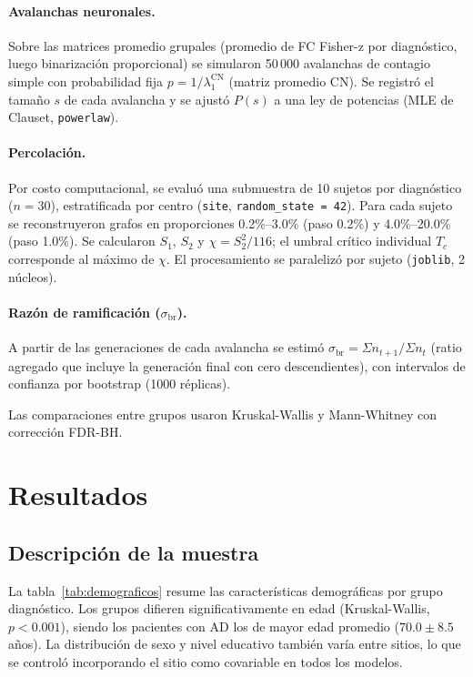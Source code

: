 \documentclass[12pt,a4paper]{article}
\begin{document}
\paragraph{Avalanchas neuronales.} Sobre las matrices promedio grupales (promedio de FC Fisher-z
por diagnóstico, luego binarización proporcional) se simularon 50\,000 avalanchas de contagio
simple con probabilidad fija $p = 1/\lambda_1^{\text{CN}}$ (matriz promedio CN). Se registró el
tamaño $s$ de cada avalancha y se ajustó $P(s)$ a una ley de potencias (MLE de Clauset,
\texttt{powerlaw}).

\paragraph{Percolación.} Por costo computacional, se evaluó una submuestra de 10 sujetos por
diagnóstico ($n = 30$), estratificada por centro (\texttt{site}, \texttt{random\_state = 42}).
Para cada sujeto se reconstruyeron grafos en proporciones 0.2\%--3.0\% (paso 0.2\%) y 4.0\%--20.0\%
(paso 1.0\%). Se calcularon $S_1$, $S_2$ y $\chi = S_2^2 / 116$; el umbral crítico individual
$T_c$ corresponde al máximo de $\chi$. El procesamiento se paralelizó por sujeto (\texttt{joblib},
2 núcleos).

\paragraph{Razón de ramificación ($\sigma_{\text{br}}$).} A partir de las generaciones de cada
avalancha se estimó $\sigma_{\text{br}} = \Sigma n_{t+1} / \Sigma n_t$ (ratio agregado que
incluye la generación final con cero descendientes), con intervalos de confianza por bootstrap
(1000 réplicas).

Las comparaciones entre grupos usaron Kruskal-Wallis y Mann-Whitney con corrección FDR-BH.

\section{Resultados}

\subsection{Descripción de la muestra}

La tabla~\ref{tab:demograficos} resume las características demográficas por grupo diagnóstico.
Los grupos difieren significativamente en edad (Kruskal-Wallis, $p < 0.001$), siendo los
pacientes con AD los de mayor edad promedio ($70.0 \pm 8.5$ años). La distribución de sexo
y nivel educativo también varía entre sitios, lo que se controló incorporando el sitio como
covariable en todos los modelos.
\end{document}
